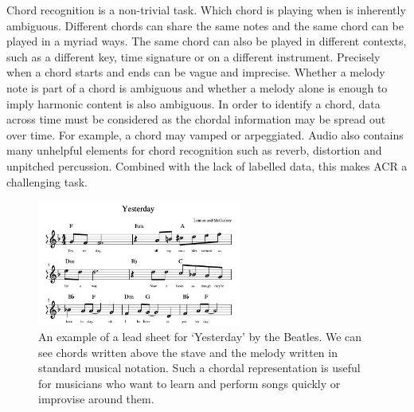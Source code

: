 Chord recognition is a non-trivial task. Which chord is playing when is inherently ambiguous. Different chords can share the same notes and the same chord can be played in a myriad ways. The same chord can also be played in different contexts, such as a different key, time signature or on a different instrument. Precisely when a chord starts and ends can be vague and imprecise. Whether a melody note is part of a chord is ambiguous and whether a melody alone is enough to imply harmonic content is also ambiguous. In order to identify a chord, data across time must be considered as the chordal information may be spread out over time. For example, a chord may vamped or arpeggiated. Audio also contains many unhelpful elements for chord recognition such as reverb, distortion and unpitched percussion. Combined with the lack of labelled data, this makes ACR a challenging task.

\begin{figure}[H]
    \centering
    \includegraphics[width=0.6\textwidth]{figures/lead_sheet_example.png}
    \caption{An example of a lead sheet for `Yesterday' by the Beatles. We can see chords written above the stave and the melody written in standard musical notation. Such a chordal representation is useful for musicians who want to learn and perform songs quickly or improvise around them.}\label{fig:lead_sheet_example}
\end{figure}



